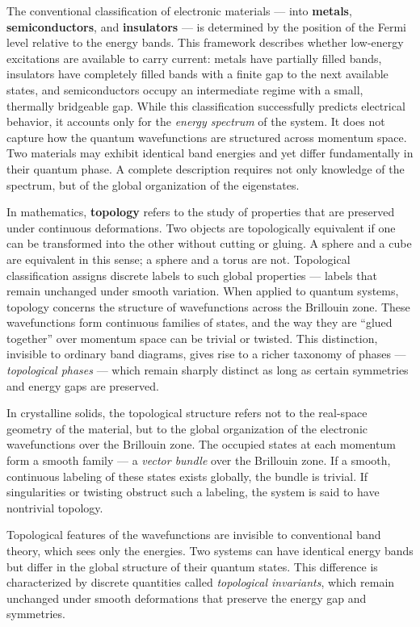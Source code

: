 The conventional classification of electronic materials — into \textbf{metals}, \textbf{semiconductors}, and \textbf{insulators} — is determined by the position of the Fermi level relative to the energy bands. This framework describes whether low-energy excitations are available to carry current: metals have partially filled bands, insulators have completely filled bands with a finite gap to the next available states, and semiconductors occupy an intermediate regime with a small, thermally bridgeable gap. While this classification successfully predicts electrical behavior, it accounts only for the \emph{energy spectrum} of the system. It does not capture how the quantum wavefunctions are structured across momentum space. Two materials may exhibit identical band energies and yet differ fundamentally in their quantum phase. A complete description requires not only knowledge of the spectrum, but of the global organization of the eigenstates.

In mathematics, \textbf{topology} refers to the study of properties that are preserved under continuous deformations. Two objects are topologically equivalent if one can be transformed into the other without cutting or gluing. A sphere and a cube are equivalent in this sense; a sphere and a torus are not. Topological classification assigns discrete labels to such global properties — labels that remain unchanged under smooth variation. When applied to quantum systems, topology concerns the structure of wavefunctions across the Brillouin zone. These wavefunctions form continuous families of states, and the way they are “glued together” over momentum space can be trivial or twisted. This distinction, invisible to ordinary band diagrams, gives rise to a richer taxonomy of phases — \emph{topological phases} — which remain sharply distinct as long as certain symmetries and energy gaps are preserved.


In crystalline solids, the topological structure refers not to the real-space geometry of the material, but to the global organization of the electronic wavefunctions over the Brillouin zone. The occupied states at each momentum form a smooth family — a \emph{vector bundle} over the Brillouin zone. If a smooth, continuous labeling of these states exists globally, the bundle is trivial. If singularities or twisting obstruct such a labeling, the system is said to have nontrivial topology.

Topological features of the wavefunctions are invisible to conventional band theory, which sees only the energies. Two systems can have identical energy bands but differ in the global structure of their quantum states. This difference is characterized by discrete quantities called \emph{topological invariants}, which remain unchanged under smooth deformations that preserve the energy gap and symmetries.

